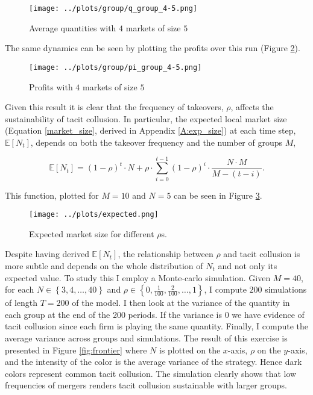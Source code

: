 \documentclass[american]{scrartcl}
\newcommand{\set}[1]{\left\{#1\right\}}
\newcommand{\E}{\mathbb{E}}
\begin{document}
\begin{figure}[H]
    \center
    \texttt{[image: ../plots/group/q\_group\_4-5.png]}
    \caption{Average quantities with $4$ markets of size $5$}
    \label{fig:small_avg}
\end{figure}

The same dynamics can be seen by plotting the profits over this run (Figure \ref{fig:small_avg_profit}).

\begin{figure}[H]
    \center
    \texttt{[image: ../plots/group/pi\_group\_4-5.png]}
    \caption{Profits with $4$ markets of size $5$}
    \label{fig:small_avg_profit}
\end{figure}

Given this result it is clear that the frequency of takeovers, $\rho$, affects the sustainability of tacit collusion. In particular, the expected local market size (Equation \ref{market_size}, derived in Appendix \ref{A:exp_size}) at each time step, $\E[N_t]$, depends on both the takeover frequency and the number of groups $M$,

\begin{equation} \label{market_size}
    \E[N_t] = (1 - \rho)^t \cdot N + \rho \cdot \sum^{t-1}_{i = 0} (1 - \rho)^{i} \cdot \frac{N \cdot M}{M - (t - i)}.
\end{equation}

This function, plotted for $M = 10$ and $N = 5$ can be seen in Figure \ref{fig:size}.


\begin{figure}[H]
    \center
    \texttt{[image: ../plots/expected.png]}
    \caption{Expected market size for different $\rho$s.}
    \label{fig:size}
\end{figure}

Despite having derived $\E[N_t]$, the relationship between $\rho$ and tacit collusion is more subtle and depends on the whole distribution of $N_t$ and not only its expected value. To study this I employ a Monte-carlo simulation. Given $M = 40$, for each $N \in \set{3, 4, \ldots, 40}$ and $\rho \in \set{0, \frac{1}{100},\frac{2}{100}, \ldots, 1}$, I compute $200$ simulations of length $T = 200$ of the model. I then look at the variance of the quantity in each group at the end of the 200 periods. If the variance is 0 we have evidence of tacit collusion since each firm is playing the same quantity. Finally, I compute the average variance across groups and simulations. The result of this exercise is presented in Figure \ref{fig:frontier} where $N$ is plotted on the $x$-axis, $\rho$ on the $y$-axis, and the intensity of the color is the average variance of the strategy. Hence dark colors represent common tacit collusion. The simulation clearly shows that low frequencies of mergers renders tacit collusion sustainable with larger groups.
\end{document}
